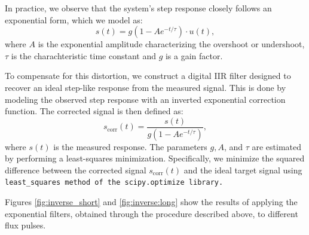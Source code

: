 In practice, we observe that the system's step response closely follows an exponential form, which we model as:
\begin{equation}
    s(t) = g(1-Ae^{-t/\tau})\cdot u(t),
\end{equation}
where $A$ is the exponential amplitude characterizing the overshoot or undershoot, $\tau$ is the charachteristic time constant and $g$ is a gain factor.

To compensate for this distortion, we construct a digital IIR filter designed to recover an ideal step-like response from the measured signal. 
This is done by modeling the observed step response with an inverted exponential correction function. The corrected signal is then defined as:
\begin{equation}\label{eq:inverse}
s_{\text{corr}}(t) = \frac{s(t)}{g(1 - Ae^{-t/\tau})},
\end{equation}
where $s(t)$ is the measured response. 
The parameters $g, A$, and $\tau$  are estimated by performing a least-squares minimization. 
Specifically, we minimize the squared difference between the corrected signal $s_{\text{corr}}(t)$ and the ideal target signal using \tt{least\_squares} method of the \tt{scipy.optimize} library.

Figures \ref{fig:inverse_short} and \ref{fig:inverse:long} show the results of applying the exponential filters, obtained through the procedure described above, to different flux pulses.

